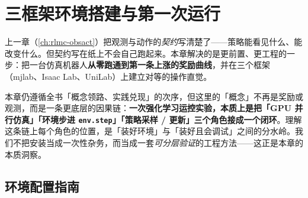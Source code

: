 \chapter{三框架环境搭建与第一次运行}\label{ch:rlmc-setup}


上一章（\cref{ch:rlmc-obsact}）把观测与动作的\emph{契约}写清楚了——策略能看见什么、能改变什么。但契约写在纸上不会自己跑起来。本章解决的是更前置、更工程的一步：把一台仿真机器人\textbf{从零跑通到第一条上涨的奖励曲线}，并在三个框架（mjlab、Isaac Lab、UniLab）上建立对等的操作直觉。

本章仍遵循全书「概念领路、实践兑现」的次序，但这里的「概念」不再是奖励或观测，而是一条更底层的因果链：\textbf{一次强化学习运控实验，本质上是把「GPU 并行仿真」「环境步进 \texttt{env.step}」「策略采样 / 更新」三个角色接成一个闭环}。理解这条链上每个角色的位置，是「装好环境」与「装好且会调试」之间的分水岭。我们不把安装当成一次性杂务，而当成一套\emph{可分层验证}的工程方法——这正是本章的本质洞察。

\section{环境配置指南}
\label{sec:rlmc-setup-prep}


